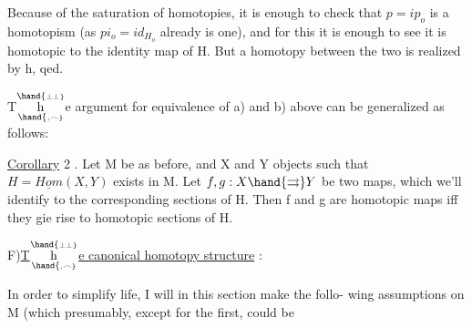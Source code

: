 Because of the saturation  of homotopies, it is enough to
check that $p = ip_o$ is a homotopism (as $pi_o = id_{H_o}$ already is one), and
for this it is enough to see it is homotopic to the identity map of H.
But a homotopy between the two is realized by h,  qed.

T$\overset{\hand{\scriptscriptstyle\perp\perp}}{\underset{\hand{\scriptscriptstyle,\frown}}{\mathrm h}}$e argument for equivalence of a) and b) above can be generalized
as follows:

\uline{Corollary} 2 . Let M be as before, and X and Y objects such that
$H = \underline{Hom}(X,Y)$ exists in M. Let $f,g: X \hand{\rightrightarrows} Y$ be two maps, which we'll
identify to the corresponding sections of H. Then f and g are homotopic
maps iff they gie rise to homotopic sections of H.

F)\quad \uline{T$\overset{\hand{\scriptscriptstyle\perp\perp}}{\underset{\hand{\scriptscriptstyle,\frown}}{\mathrm h}}$e canonical homotopy structure} : 

In order to simplify life, I will in this section make the follo-%
wing assumptions on M (which presumably, except for the first, could be

